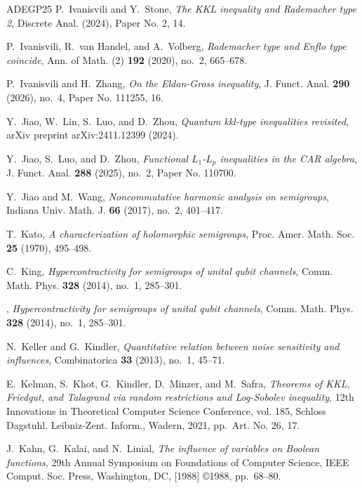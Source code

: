 \documentclass{amsbook}
\theoremstyle{definition}
\theoremstyle{remark}
\numberwithin{section}{chapter}
\numberwithin{equation}{chapter}
\newcommand{\1}{\mathbf{1}}
\begin{document}
\begin{thebibliography}{ADEGP25}
	P.~Ivanisvili and Y.~Stone, \emph{The {KKL} inequality and {R}ademacher type
		2}, Discrete Anal. (2024), Paper No. 2, 14. 
	
	P.~Ivanisvili, R.~van Handel, and A.~Volberg, \emph{Rademacher type and {E}nflo
		type coincide}, Ann. of Math. (2) \textbf{192} (2020), no.~2, 665--678.
	
	P.~Ivanisvili and H.~Zhang, \emph{On the {E}ldan-{G}ross inequality}, J. Funct.
	Anal. \textbf{290} (2026), no.~4, Paper No. 111255, 16. 
	
	Y.~Jiao, W.~Lin, S.~Luo, and D.~Zhou, \emph{Quantum kkl-type inequalities
		revisited}, arXiv preprint arXiv:2411.12399 (2024).
	
	Y.~Jiao, S.~Luo, and D.~Zhou, \emph{Functional {$L_1$}-{$L_p$} inequalities in
		the {CAR} algebra}, J. Funct. Anal. \textbf{288} (2025), no.~2, Paper No.
	110700. 
	
	Y.~Jiao and M.~Wang, \emph{Noncommutative harmonic analysis on semigroups},
	Indiana Univ. Math. J. \textbf{66} (2017), no.~2, 401--417. 
	
	T.~Kato, \emph{A characterization of holomorphic semigroups}, Proc. Amer. Math.
	Soc. \textbf{25} (1970), 495--498. 
	
	C.~King, \emph{Hypercontractivity for semigroups of unital qubit channels},
	Comm. Math. Phys. \textbf{328} (2014), no.~1, 285--301. 
	
	\bysame, \emph{Hypercontractivity for semigroups of unital qubit channels},
	Comm. Math. Phys. \textbf{328} (2014), no.~1, 285--301. 
	
	N.~Keller and G.~Kindler, \emph{Quantitative relation between noise sensitivity
		and influences}, Combinatorica \textbf{33} (2013), no.~1, 45--71.
	
	E.~Kelman, S.~Khot, G.~Kindler, D.~Minzer, and M.~Safra, \emph{Theorems of
		{KKL}, {F}riedgut, and {T}alagrand via random restrictions and
		{L}og-{S}obolev inequality}, 12th {I}nnovations in {T}heoretical {C}omputer
	{S}cience {C}onference, vol. 185, Schloss Dagstuhl. Leibniz-Zent. Inform.,
	Wadern, 2021, pp.~Art. No. 26, 17.
	
	J.~Kahn, G.~Kalai, and N.~Linial, \emph{The influence of variables on {B}oolean
		functions}, 29th {A}nnual {S}ymposium on {F}oundations of {C}omputer
	{S}cience, IEEE Comput. Soc. Press, Washington, DC, [1988] \copyright 1988,
	pp.~68--80. 
	

\end{thebibliography}
\end{document}
